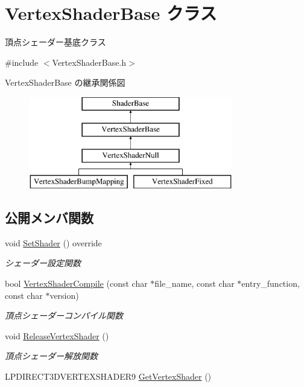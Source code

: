 \hypertarget{class_vertex_shader_base}{}\section{Vertex\+Shader\+Base クラス}
\label{class_vertex_shader_base}


頂点シェーダー基底クラス  




{\ttfamily \#include $<$Vertex\+Shader\+Base.\+h$>$}

Vertex\+Shader\+Base の継承関係図\begin{figure}[H]
\begin{center}
\leavevmode
\includegraphics[height=4.000000cm]{class_vertex_shader_base}
\end{center}
\end{figure}
\subsection*{公開メンバ関数}
\begin{DoxyCompactItemize}
\item 
void \mbox{\hyperlink{class_vertex_shader_base_a9f93697c5668852850f0a7b7ef7cb67f}{Set\+Shader}} () override
\begin{DoxyCompactList}\small\item\em シェーダー設定関数 \end{DoxyCompactList}\item 
bool \mbox{\hyperlink{class_vertex_shader_base_a6565abadb8ac173d3273ab1698d31c6c}{Vertex\+Shader\+Compile}} (const char $\ast$file\+\_\+name, const char $\ast$entry\+\_\+function, const char $\ast$version)
\begin{DoxyCompactList}\small\item\em 頂点シェーダーコンパイル関数 \end{DoxyCompactList}\item 
void \mbox{\hyperlink{class_vertex_shader_base_a42ff1e32a2c231f77d0ba0e6a8312e63}{Release\+Vertex\+Shader}} ()
\begin{DoxyCompactList}\small\item\em 頂点シェーダー解放関数 \end{DoxyCompactList}\item 
L\+P\+D\+I\+R\+E\+C\+T3\+D\+V\+E\+R\+T\+E\+X\+S\+H\+A\+D\+E\+R9 \mbox{\hyperlink{class_vertex_shader_base_ab10cf1aac4a54653c553b5c84e1d3703}{Get\+Vertex\+Shader}} ()
\end{DoxyCompactItemize}


